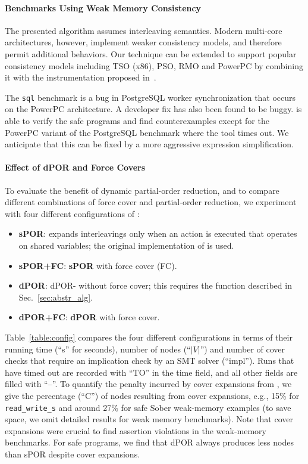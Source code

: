 \documentclass[conference]{IEEEtran}
\begin{document}
\paragraph*{Benchmarks Using Weak Memory Consistency}

The presented algorithm assumes interleaving semantics. Modern
multi-core architectures, however, implement weaker consistency models,
and therefore permit additional behaviors. Our technique can be
extended to support popular consistency models including TSO (x86), PSO,
RMO and PowerPC by combining it with the instrumentation proposed
in~\cite{DBLP:conf/esop/AlglaveKNT13}.

The \texttt{sql} benchmark is a bug in PostgreSQL worker synchronization
that occurs on the PowerPC architecture.  A developer fix has also been
found to be buggy.   is able to verify the safe programs and
find counterexamples except for the PowerPC variant of the PostgreSQL
benchmark where the tool times out.  We anticipate that this can be fixed by
a more aggressive expression simplification.

\paragraph*{Effect of dPOR and Force Covers}

To evaluate the benefit of dynamic partial-order reduction,
and to compare different combinations of force cover and partial-order
reduction, we experiment with four different configurations of :
%
\begin{itemize}
  \item{\bf sPOR}: expands interleavings only when an action is executed
  that operates on shared variables; the original implementation of
   is used.
  \item {\bf sPOR+FC}: {\bf sPOR} with force cover
  (FC).
  \item {\bf dPOR}: dPOR- without force cover; this
  requires the \prog{\dporclose} function described in
  Sec.~\ref{sec:abstr_alg}.
  \item {\bf dPOR+FC}: {\bf dPOR} with force cover.
\end{itemize}
%
Table~\ref{table:config} compares the four different configurations in terms
of their running time (``s'' for seconds), number of nodes (``$|V|$'') and
number of cover checks that require an implication check by an SMT solver
(``impl''). Runs that have timed out are recorded with ``TO'' in the time field,
and all other fields are filled with ``--''.
To quantify the penalty incurred by cover expansions from \prog{\dporclose},
we give the percentage (``C'') of nodes resulting from cover expansions,
e.g., 15\% for \texttt{read\_write\_s} and around 27\% for safe Sober weak-memory examples
(to save space, we omit detailed results for weak memory benchmarks).
Note that cover expansions were crucial to find
assertion violations in the weak-memory benchmarks.
For safe programs, we find that dPOR always produces less nodes than sPOR despite cover expansions.
\end{document}
